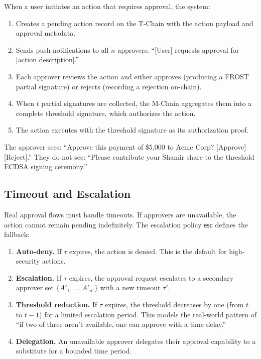\documentclass[11pt,a4paper]{article}
\begin{document}
When a user initiates an action that requires approval, the system:

\begin{enumerate}
    \item Creates a pending action record on the T-Chain with the action
    payload and approval metadata.
    \item Sends push notifications to all $n$ approvers: ``[User] requests
    approval for [action description].''
    \item Each approver reviews the action and either approves (producing
    a FROST partial signature) or rejects (recording a rejection on-chain).
    \item When $t$ partial signatures are collected, the M-Chain aggregates
    them into a complete threshold signature, which authorizes the action.
    \item The action executes with the threshold signature as its
    authorization proof.
\end{enumerate}

The approver sees: ``Approve this payment of \$5,000 to Acme Corp?
[Approve] [Reject].'' They do not see: ``Please contribute your Shamir
share to the threshold ECDSA signing ceremony.''

\subsection{Timeout and Escalation}

Real approval flows must handle timeouts. If approvers are unavailable,
the action cannot remain pending indefinitely. The escalation policy
$\mathsf{esc}$ defines the fallback:

\begin{enumerate}
    \item \textbf{Auto-deny.} If $\tau$ expires, the action is denied.
    This is the default for high-security actions.
    \item \textbf{Escalation.} If $\tau$ expires, the approval request
    escalates to a secondary approver set $\{A'_1, \ldots, A'_{n'}\}$
    with a new timeout $\tau'$.
    \item \textbf{Threshold reduction.} If $\tau$ expires, the threshold
    decreases by one (from $t$ to $t-1$) for a limited escalation period.
    This models the real-world pattern of ``if two of three aren't
    available, one can approve with a time delay.''
    \item \textbf{Delegation.} An unavailable approver delegates their
    approval capability to a substitute for a bounded time period.
\end{enumerate}
\end{document}
